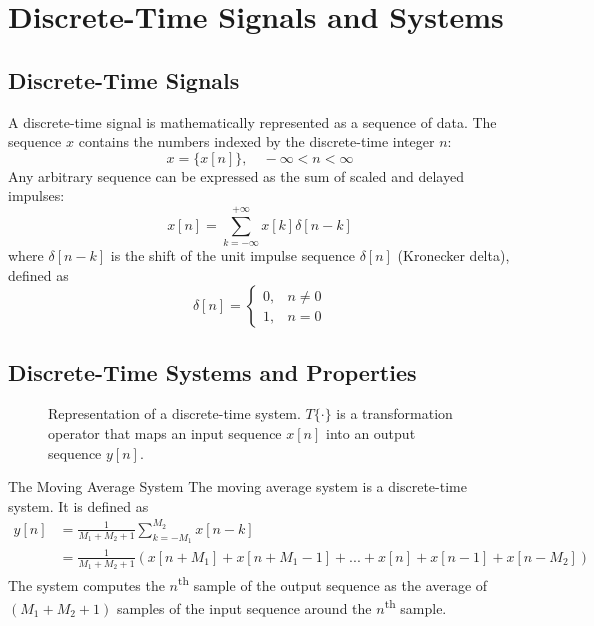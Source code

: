 \section{Discrete-Time Signals and Systems}
\subsection{Discrete-Time Signals}
A discrete-time signal is mathematically represented
as a sequence of data. The
sequence $x$ contains the numbers indexed by
the discrete-time integer $n$:
\[
    x = \{ x[n] \}, \quad -\infty < n < \infty
\]
Any arbitrary sequence can be expressed as the sum of scaled and delayed impulses:
\[
    x[n] = \sum_{k=-\infty}^{+\infty} x[k] \delta[n-k]
\]
where $\delta[n-k]$ is the shift of the unit impulse sequence $\delta[n]$ (Kronecker delta), defined as
\[
    \delta[n] = 
    \begin{cases}
        0,  & n \neq 0 \\
        1,  & n = 0
    \end{cases}
\]

\subsection{Discrete-Time Systems and Properties}
\begin{figure}[H]
    \centering
    \caption{Representation of a discrete-time system. $T\{\cdot\}$ is a transformation operator that maps an input sequence $x[n]$ into an output sequence $y[n]$.}
    \label{fig:dt_sys}
\end{figure}

\begin{ex}{The Moving Average System}
The moving average system is a discrete-time system. It is defined as
\begin{align*}
    y[n] 
    & = \frac{1}{M_1 + M_2 + 1} \sum_{k=-M_1}^{M_2} x[n-k] \\
    & = \frac{1}{M_1 + M_2 + 1} (x[n+M_1] + x[n+M_1 -1] + ... + x[n] + x[n-1] + x[n-M_2])
\end{align*}
The system computes the $n$\textsuperscript{th} sample of the output sequence as the average of $(M_1+M_2+1)$ samples of the input sequence around the $n$\textsuperscript{th} sample.
\end{ex}
